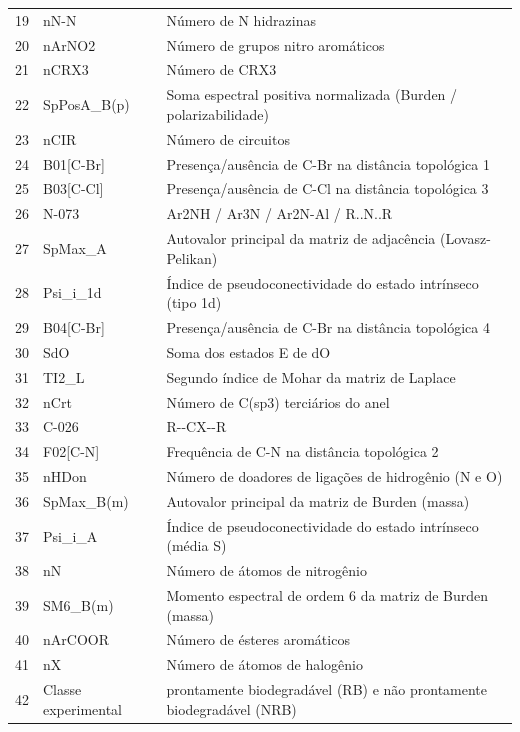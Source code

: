 \documentclass[12pt, a4paper]{article}
\begin{document}
\begin{longtable}{clp{9cm}}
19 & nN-N          & Número de N hidrazinas \\
20 & nArNO2        & Número de grupos nitro aromáticos \\
21 & nCRX3         & Número de CRX3 \\
22 & SpPosA\_B(p)  & Soma espectral positiva normalizada (Burden / polarizabilidade) \\
23 & nCIR          & Número de circuitos \\
24 & B01[C-Br]     & Presença/ausência de C-Br na distância topológica 1 \\
25 & B03[C-Cl]     & Presença/ausência de C-Cl na distância topológica 3 \\
26 & N-073         & Ar2NH / Ar3N / Ar2N-Al / R..N..R \\
27 & SpMax\_A      & Autovalor principal da matriz de adjacência (Lovasz-Pelikan) \\
28 & Psi\_i\_1d    & Índice de pseudoconectividade do estado intrínseco (tipo 1d) \\
29 & B04[C-Br]     & Presença/ausência de C-Br na distância topológica 4 \\
30 & SdO           & Soma dos estados E de dO \\
31 & TI2\_L        & Segundo índice de Mohar da matriz de Laplace \\
32 & nCrt          & Número de C(sp3) terciários do anel \\
33 & C-026         & R-{}-CX-{}-R \\
34 & F02[C-N]      & Frequência de C-N na distância topológica 2 \\
35 & nHDon         & Número de doadores de ligações de hidrogênio (N e O) \\
36 & SpMax\_B(m)   & Autovalor principal da matriz de Burden (massa) \\
37 & Psi\_i\_A     & Índice de pseudoconectividade do estado intrínseco (média S) \\
38 & nN            & Número de átomos de nitrogênio \\
39 & SM6\_B(m)     & Momento espectral de ordem 6 da matriz de Burden (massa) \\
40 & nArCOOR       & Número de ésteres aromáticos \\
41 & nX            & Número de átomos de halogênio \\
42 & Classe experimental & prontamente biodegradável (RB) e não prontamente biodegradável (NRB) \\
\bottomrule
\end{longtable}
\end{document}
